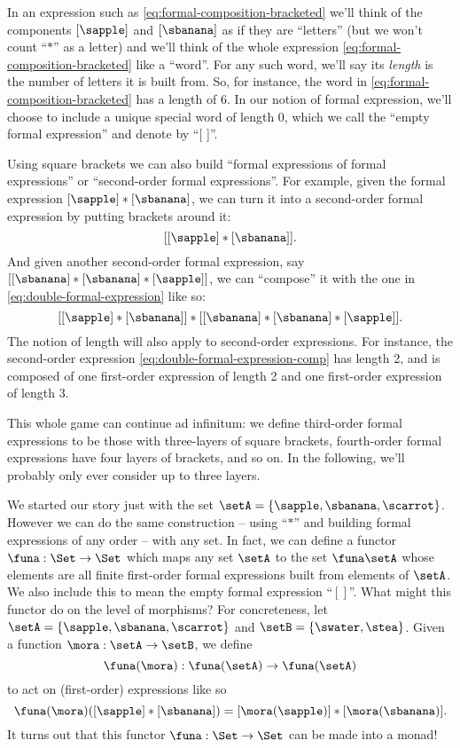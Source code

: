In an expression such as \cref{eq:formal-composition-bracketed} we'll think of the components $[\sapple]$ and $[\sbanana]$ as if they are ``letters'' (but we won't count ``$*$'' as a letter) and we'll think of the whole expression \cref{eq:formal-composition-bracketed} like a ``word''. For any such word, we'll say its \emph{length} is the number of letters it is built from. So, for instance, the word in \cref{eq:formal-composition-bracketed} has a length of $6$. In our notion of formal expression, we'll choose to include a unique special word of length $0$, which we call the ``empty formal expression'' and denote by ``[ ]''.



Using square brackets we can also build ``formal expressions of formal expressions'' or ``second-order formal expressions''. For example, given the formal expression $[\sapple] * [\sbanana]$, we can turn it into a second-order formal expression by putting brackets around it:
\begin{equation}\label{eq:double-formal-expression}
[[\sapple] * [\sbanana]].
\end{equation}
And given another second-order formal expression, say $[[\sbanana] * [\sbanana] * [\sapple]]$, we can ``compose'' it with the one in \cref{eq:double-formal-expression} like so:
\begin{equation}\label{eq:double-formal-expression-comp}
[[\sapple] * [\sbanana]] * [[\sbanana] * [\sbanana] * [\sapple]].
\end{equation}
The notion of length will also apply to second-order expressions. For instance, the second-order expression \cref{eq:double-formal-expression-comp} has length 2, and is composed of one first-order expression of length 2 and one first-order expression of length 3.

This whole game can continue ad infinitum: we define third-order formal expressions to be those with three-layers of square brackets, fourth-order formal expressions have four layers of brackets, and so on. In the following, we'll probably only ever consider up to three layers.

We started our story just with the set $\setA = \{ \sapple, \sbanana, \scarrot \}$. However we can do the same construction -- using ``$*$'' and building formal expressions of any order -- with any set. In fact, we can define a functor $\funa: \Set \to \Set$ which maps any set $\setA$ to the set $\funa \setA$ whose elements are all finite first-order formal expressions built from elements of $\setA$. We also include this to mean the empty formal expression ``$[ ]$''. What might this functor do on the level of morphisms? For concreteness, let $\setA = \{ \sapple, \sbanana, \scarrot \} $ and $\setB = \{ \swater, \stea \}$. Given a function $\mora: \setA \to \setB$, we define
\begin{equation}
\funa(\mora) : \funa(\setA) \to \funa(\setA)
\end{equation}
to act on (first-order) expressions like so
\begin{equation}
\funa(\mora)([\sapple]*[\sbanana]) = [\mora(\sapple)]*[\mora(\sbanana)].
\end{equation}
It turns out that this functor $\funa: \Set \to \Set$ can be made into a monad!

